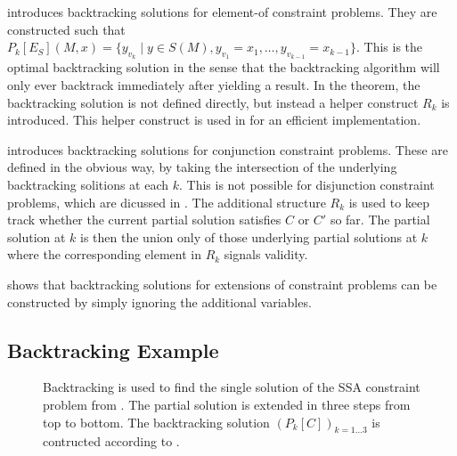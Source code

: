 \begin{figure}[p]
    
\end{figure}

\begin{figure}[p]
    
\end{figure}

     introduces backtracking solutions for element-of
    constraint problems.
    They are constructed such that
    $P_k[E_S](M,x)=\{y_{v_k}\mid y\in S(M), y_{v_1}=x_1,\dots,y_{v_{k-1}}=x_{k-1}\}$.
    This is the optimal backtracking solution in the sense that the backtracking
    algorithm will only ever backtrack immediately after yielding a result.
    In the theorem, the backtracking solution is not defined directly, but
    instead a helper construct $R_k$ is introduced.
    This helper construct is used in  for an efficient
    implementation.

     introduces backtracking solutions for conjunction
    constraint problems.
    These are defined in the obvious way, by taking the intersection of
    the underlying backtracking solitions at each $k$.
    This is not possible for disjunction constraint problems, which are dicussed
    in .
    The additional structure $R_k$ is used to keep track whether the current
    partial solution satisfies $C$ or $C'$ so far.
    The partial solution at $k$ is then the union only of those underlying
    partial solutions at $k$ where the corresponding element in $R_k$
    signals validity.

     shows that backtracking solutions for extensions of
    constraint problems can be constructed by simply ignoring the additional
    variables.

\subsection{Backtracking Example}

\begin{figure}[p]
    
    \caption{Backtracking is used to find the single solution of the SSA
             constraint problem from .
             The partial solution is extended in three steps from top to bottom.
             The backtracking solution $(P_k[C])_{k=1\dots3}$ is contructed
             according to .}
    \label{fig:backtracsol}
\end{figure}

